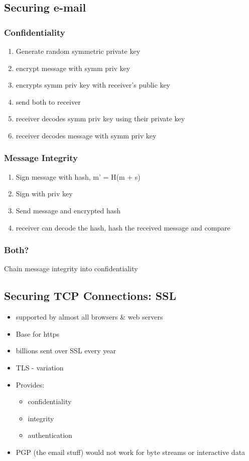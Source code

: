\documentclass{article}
\begin{document}
\subsection{Securing e-mail}

\subsubsection*{Confidentiality}

\begin{enumerate}
	\item Generate random symmetric private key
	\item encrypt message with symm priv key
	\item encrypts symm priv key with receiver's public key
	\item send both to receiver
	\item receiver decodes symm priv key using their private key
	\item receiver decodes message with symm priv key
\end{enumerate}

\subsubsection*{Message Integrity}

\begin{enumerate}
	\item Sign message with hash, m' = H(m + s)
	\item Sign with priv key
	\item Send message and encrypted hash
	\item receiver can decode the hash, hash the received message and compare
\end{enumerate}

\subsubsection*{Both?}

Chain message integrity into confidentiality

\subsection{Securing TCP Connections: SSL}

\begin{itemize}
	\item supported by almost all browsers \& web servers
	\item Base for https
	\item billions sent over SSL every year
	\item TLS - variation
	\item Provides:
	\begin{itemize}
		\item confidentiality
		\item integrity
		\item authentication
	\end{itemize}
	\item PGP (the email stuff) would not work for byte streams or interactive data
\end{itemize}
\end{document}
